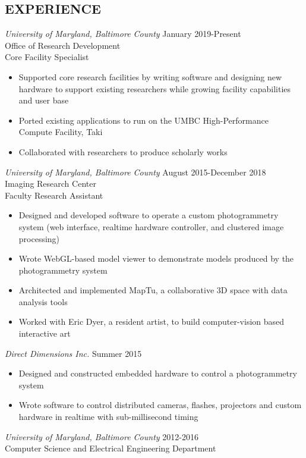 \documentclass[line]{resume}
\begin{document}
\begin{resume}
\section{EXPERIENCE}
  {\sl University of Maryland, Baltimore County} \hfill January 2019-Present \\
    Office of Research Development \\
    Core Facility Specialist
    \begin{itemize}
        \item Supported core research facilities by writing software and designing new hardware to support existing researchers while growing facility capabilities and user base
        \item Ported existing applications to run on the UMBC High-Performance Compute Facility, Taki
        \item Collaborated with researchers to produce scholarly works
    \end{itemize}
  {\sl University of Maryland, Baltimore County} \hfill August 2015-December 2018 \\
    Imaging Research Center \\
    Faculty Research Assistant
    \begin{itemize}
      \item Designed and developed software to operate a custom photogrammetry system (web interface, realtime hardware controller, and clustered image processing)
      \item Wrote WebGL-based model viewer to demonstrate models produced by the photogrammetry system
      \item Architected and implemented MapTu, a collaborative 3D space with data analysis tools
      \item Worked with Eric Dyer, a resident artist, to build computer-vision based interactive art
    \end{itemize}
  {\sl Direct Dimensions Inc.} \hfill Summer 2015
    \begin{itemize}
      \item Designed and constructed embedded hardware to control a photogrammetry system
      \item Wrote software to control distributed cameras, flashes, projectors and custom hardware in realtime with sub-millisecond timing
    \end{itemize}
  {\sl University of Maryland, Baltimore County} \hfill 2012-2016 \\
    Computer Science and Electrical Engineering Department \\

\end{resume}
\end{document}
